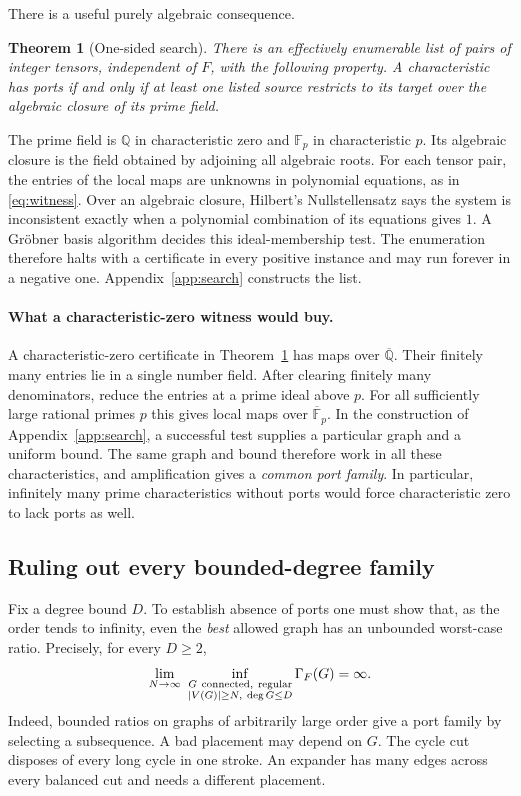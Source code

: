 \documentclass[11pt]{article}
\newtheorem{theorem}{Theorem}[section]
\theoremstyle{definition}
\newcommand{\F}{\mathbb F}
\begin{document}
There is a useful purely algebraic consequence.
\begin{theorem}[One-sided search]\label{thm:search}
There is an effectively enumerable list of pairs of integer tensors,
independent of \(F\), with the following property. A characteristic has
ports if and only if at least one listed source restricts to its target
over the algebraic closure of its prime field.
\end{theorem}
The prime field is \(\mathbb Q\) in characteristic zero and \(\F_p\) in
characteristic \(p\). Its algebraic closure is the field obtained by
adjoining all algebraic roots. For each tensor pair, the entries of the
local maps are unknowns in polynomial equations, as in
\eqref{eq:witness}. Over an algebraic closure, Hilbert's Nullstellensatz
says the system is inconsistent exactly when a polynomial combination
of its equations gives \(1\). A Gr\"obner basis algorithm decides this
ideal-membership test. The enumeration therefore halts with a certificate
in every positive instance and may run forever in a negative one.
Appendix~\ref{app:search} constructs the list.

\paragraph{What a characteristic-zero witness would buy.}
A characteristic-zero certificate in Theorem~\ref{thm:search} has maps
over \(\overline{\mathbb Q}\). Their finitely many entries lie in a single
number field.
After clearing finitely many denominators, reduce the entries at a prime
ideal above \(p\). For all sufficiently large rational primes \(p\) this
gives local maps over \(\overline{\F}_p\). In the construction of
Appendix~\ref{app:search}, a successful test supplies a particular graph
and a uniform bound. The same graph and bound therefore work in all these
characteristics, and amplification gives a \emph{common port family}.
In particular, infinitely many prime characteristics without ports would
force characteristic zero to lack ports as well.

\subsection{Ruling out every bounded-degree family}

Fix a degree bound \(D\). To establish absence of ports one must show that,
as the order tends to infinity, even the \emph{best} allowed graph has an
unbounded worst-case ratio. Precisely, for every \(D\ge2\),
\[
 \lim_{N\to\infty}\
 \inf_{\substack{G\ {\rm connected,\ regular}\\ |V(G)|\ge N,\ \deg G\le D}}
             \Gamma_F(G)=\infty .
\]
Indeed, bounded ratios on graphs of arbitrarily large order give a port
family by selecting a subsequence. A bad placement may depend on \(G\).
The cycle cut disposes of every long cycle in one stroke. An expander has
many edges across every balanced cut and needs a different placement.
\end{document}
